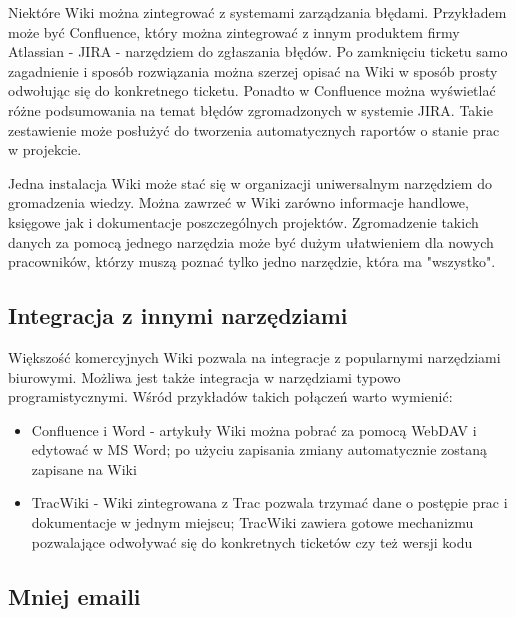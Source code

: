 \documentclass{article}
\begin{document}
	Niektóre Wiki można zintegrować z systemami zarządzania błędami. Przykładem może być Confluence, który można zintegrować z innym produktem firmy Atlassian - JIRA - narzędziem do zgłaszania błędów. Po zamknięciu ticketu samo zagadnienie i sposób rozwiązania można szerzej opisać na Wiki w sposób prosty odwołując się do konkretnego ticketu. Ponadto w Confluence można wyświetlać różne podsumowania na temat błędów zgromadzonych w systemie JIRA. Takie zestawienie może posłużyć do tworzenia automatycznych raportów o stanie prac w projekcie.

	Jedna instalacja Wiki może stać się w organizacji uniwersalnym narzędziem do gromadzenia wiedzy. Można zawrzeć w Wiki zarówno informacje handlowe, księgowe jak i dokumentacje poszczególnych projektów. Zgromadzenie takich danych za pomocą jednego narzędzia może być dużym ułatwieniem dla nowych pracowników, którzy muszą poznać tylko jedno narzędzie, która ma "wszystko". 



	\subsection{Integracja z innymi narzędziami}

	Większość komercyjnych Wiki pozwala na integracje z popularnymi narzędziami biurowymi. Możliwa jest także integracja w narzędziami typowo programistycznymi. Wśród przykładów takich połączeń warto wymienić:

\begin{itemize}
\item Confluence i Word - artykuły Wiki można pobrać za pomocą WebDAV i  edytować w MS Word; po użyciu zapisania zmiany automatycznie zostaną zapisane na Wiki
\item TracWiki - Wiki zintegrowana z Trac pozwala trzymać dane o postępie prac i dokumentacje w jednym miejscu; TracWiki zawiera gotowe mechanizmu pozwalające odwoływać się do konkretnych ticketów czy też wersji kodu 

\end{itemize} 




	\subsection{Mniej emaili}
\end{document}
